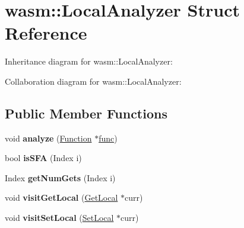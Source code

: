 \hypertarget{structwasm_1_1_local_analyzer}{}\section{wasm\+:\+:Local\+Analyzer Struct Reference}
\label{structwasm_1_1_local_analyzer}


Inheritance diagram for wasm\+:\+:Local\+Analyzer\+:


Collaboration diagram for wasm\+:\+:Local\+Analyzer\+:
\subsection*{Public Member Functions}
\begin{DoxyCompactItemize}
\item 
\mbox{\label{structwasm_1_1_local_analyzer_aa4a596a0ae501e228043b71b329c2768}} 
void {\bfseries analyze} (\mbox{\hyperlink{classwasm_1_1_function}{Function}} $\ast$\mbox{\hyperlink{structfunc}{func}})
\item 
\mbox{\label{structwasm_1_1_local_analyzer_a8a3bb18ca773ca4df65b62c21c69d9c6}} 
bool {\bfseries is\+S\+FA} (Index i)
\item 
\mbox{\label{structwasm_1_1_local_analyzer_af02107e37d05e2b5bcf44126dff92d98}} 
Index {\bfseries get\+Num\+Gets} (Index i)
\item 
\mbox{\label{structwasm_1_1_local_analyzer_a31aeb0387f2d2f919c2f628e0d7e199a}} 
void {\bfseries visit\+Get\+Local} (\mbox{\hyperlink{classwasm_1_1_get_local}{Get\+Local}} $\ast$curr)
\item 
\mbox{\label{structwasm_1_1_local_analyzer_ad5c0f847246d4c946303ebf2c4466d72}} 
void {\bfseries visit\+Set\+Local} (\mbox{\hyperlink{classwasm_1_1_set_local}{Set\+Local}} $\ast$curr)
\end{DoxyCompactItemize}

